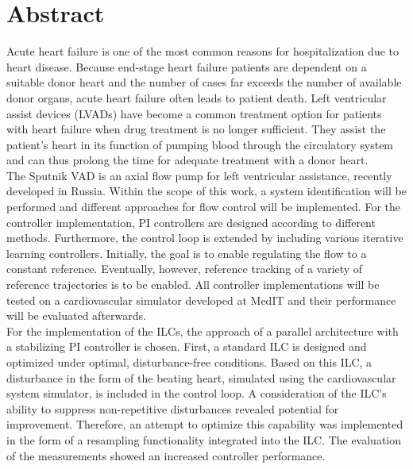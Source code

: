 \chapter{Abstract}

Acute heart failure is one of the most common reasons for hospitalization due to heart disease. Because end-stage heart failure patients are dependent on a suitable donor heart and the number of cases far exceeds the number of available donor organs, acute heart failure often leads to patient death. Left ventricular assist devices (LVADs) have become a common treatment option for patients with heart failure when drug treatment is no longer sufficient. They assist the patient's heart in its function of pumping blood through the circulatory system and can thus prolong the time for adequate treatment with a donor heart.
\\
The Sputnik VAD is an axial flow pump for left ventricular assistance, recently developed in Russia. Within the scope of this work, a system identification will be performed and different approaches for flow control will be implemented. For the controller implementation, PI controllers are designed according to different methods. Furthermore, the control loop is extended by including various iterative learning controllers. Initially, the goal is to enable regulating the flow to a constant reference. Eventually, however, reference tracking of a variety of reference trajectories is to be enabled. All controller implementations will be tested on a cardiovascular simulator developed at MedIT and their performance will be evaluated afterwards.
\\
For the implementation of the ILCs, the approach of a parallel architecture with a stabilizing PI controller is chosen.
First, a standard ILC is designed and optimized under optimal, disturbance-free conditions. Based on this ILC, a disturbance in the form of the beating heart, simulated using the cardiovascular system simulator, is included in the control loop. A consideration of the ILC's ability to suppress non-repetitive disturbances revealed potential for improvement. Therefore, an attempt to optimize this capability was implemented in the form of a resampling functionality integrated into the ILC. The evaluation of the measurements showed an increased controller performance.


\cleardoubleemptypage
\thispagestyle{empty}

